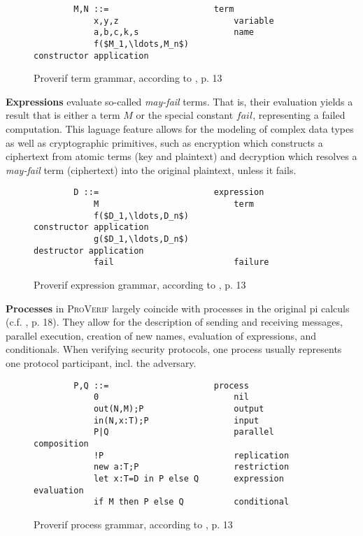 \begin{figure}[h!]
    \centering
    \begin{lstlisting}
        M,N ::=                     term
            x,y,z                       variable
            a,b,c,k,s                   name
            f($M_1,\ldots,M_n$)                         constructor application
    \end{lstlisting}
    \caption{Proverif term grammar, according to \cite{blanchet2016modeling}, p. 13}
    \label{fig:pv-terms}
\end{figure}

\textbf{Expressions} evaluate so-called \textit{may-fail} terms.
That is, their evaluation yields a result that is either a term $M$ or the special constant $fail$, representing a failed computation.
This laguage feature allows for the modeling of complex data types as well as cryptographic primitives, such as encryption which constructs a ciphertext from atomic terms (key and plaintext) and decryption which resolves a \textit{may-fail} term (ciphertext) into the original plaintext, unless it fails.

\begin{figure}[h!]
    \centering
    \begin{lstlisting}
        D ::=                       expression
            M                           term
            f($D_1,\ldots,D_n$)                         constructor application
            g($D_1,\ldots,D_n$)                         destructor application
            fail                        failure
    \end{lstlisting}
    \caption{Proverif expression grammar, according to \cite{blanchet2016modeling}, p. 13}
    \label{fig:pv-expressions}
\end{figure}

\textbf{Processes} in \textsc{ProVerif} largely coincide with processes in the original pi calculs (c.f. \cite{blanchet2016modeling}, p. 18).
They allow for the description of sending and receiving messages, parallel execution, creation of new names, evaluation of expressions, and conditionals.
When verifying security protocols, one process usually represents one protocol participant, incl. the adversary.

\begin{figure}[h!]
    \centering
    \begin{lstlisting}
        P,Q ::=                     process
            0                           nil
            out(N,M);P                  output
            in(N,x:T);P                 input
            P|Q                         parallel composition
            !P                          replication
            new a:T;P                   restriction
            let x:T=D in P else Q       expression evaluation
            if M then P else Q          conditional
    \end{lstlisting}
    \caption{Proverif process grammar, according to \cite{blanchet2016modeling}, p. 13}
    \label{fig:pv-processes}
\end{figure}

